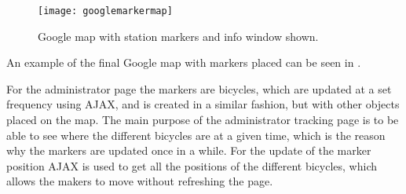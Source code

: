 \begin{figure}[h]
	\centering
	\texttt{[image: googlemarkermap]}
	\caption{Google map with station markers and info window shown.}
	\label{fig:googlemapmarkerinfowindow}
\end{figure}

An example of the final Google map with markers placed can be seen in .

For the administrator page the markers are bicycles, which are updated at a set frequency using AJAX, and is created in a similar fashion, but with other objects placed on the map.
The main purpose of the administrator tracking page is to be able to see where the different bicycles are at a given time, which is the reason why the markers are updated once in a while.
For the update of the marker position AJAX is used to get all the positions of the different bicycles, which allows the makers to move without refreshing the page.